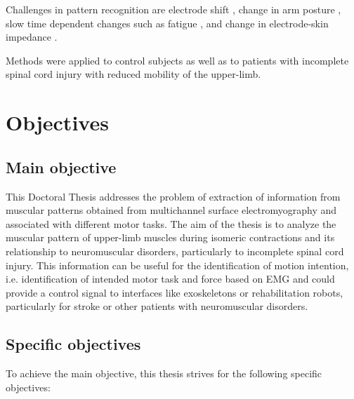 Challenges in pattern recognition are electrode shift \citep{Hargrove2008, Young2011}, change in arm posture \citep{Fougner2011}, slow time dependent changes \citep{Farina2014} such as fatigue \citep{Tkach2010}, and change in electrode-skin impedance \citep{Clancy2002a}.

Methods  were applied to control subjects as well as to patients with incomplete spinal cord injury with reduced mobility of the upper-limb.

     \section{Objectives}
     
     	\subsection*{Main objective}

This Doctoral Thesis addresses the problem of extraction of information from muscular patterns obtained from multichannel surface electromyography and associated with different motor tasks. The aim of the thesis is to analyze the muscular pattern of upper-limb muscles during isomeric contractions and its relationship to neuromuscular disorders, particularly to incomplete spinal cord injury. This information can be useful for the identification of motion intention, i.e. identification of intended motor task and force based on EMG and could provide a control signal to interfaces like exoskeletons or rehabilitation robots, particularly for stroke or other patients with neuromuscular disorders.




        
        \subsection*{Specific objectives}
        
To achieve the main objective, this thesis strives for the following specific objectives:

